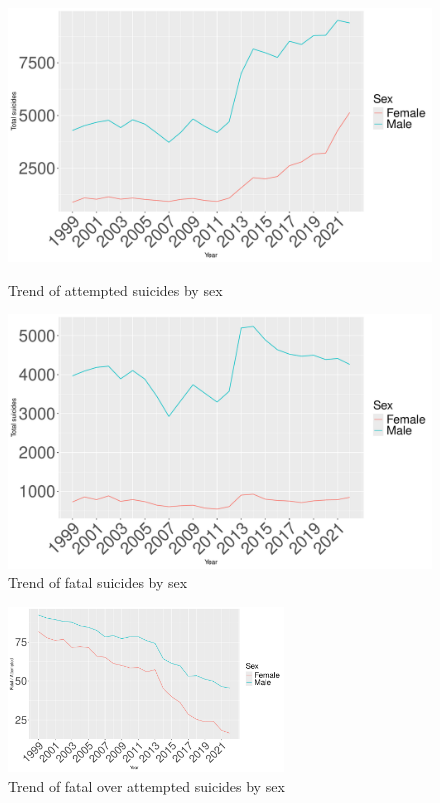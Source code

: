 \documentclass{article}
\begin{document}
\begin{figure}[H]
    \centering
    \begin{minipage}{0.65\textwidth}
        \includegraphics[width=\textwidth]{imgs/sex_attempted.pdf}
        \caption{Trend of attempted suicides by sex }
	\label{fig:sex_attempted}
    \end{minipage}
    \hfill
    \begin{minipage}{0.65\textwidth}
        \includegraphics[width=\textwidth]{imgs/sex_fatal.pdf}
        \caption{Trend of fatal suicides by sex }
	\label{fig:sex_fatal}
    \end{minipage}
\end{figure}

\begin{figure}[H]
    \centering
    \includegraphics[width=0.65\textwidth]{imgs/sex_foa.pdf}
    \caption{Trend of fatal over attempted suicides by sex }
    \label{fig:sex_foa}
\end{figure}
\end{document}
